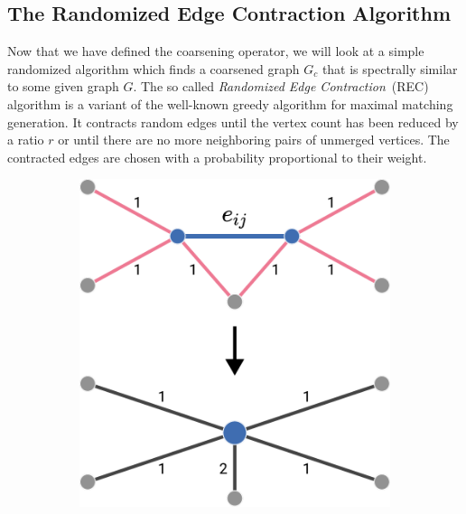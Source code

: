 \subsection{The Randomized Edge Contraction Algorithm}%
\label{sec:coarse:rec}

Now that we have defined the coarsening operator, we will look at a simple randomized algorithm which finds a coarsened graph $G_c$ that is spectrally similar to some given graph $G$.
The so called \textit{Randomized Edge Contraction}~(REC)~\cite{Loukas2018} algorithm is a variant of the well-known greedy algorithm for maximal matching generation.
It contracts random edges until the vertex count has been reduced by a ratio $r$ or until there are no more neighboring pairs of unmerged vertices.
The contracted edges are chosen with a probability proportional to their weight.
\begin{figure}[H]
	\setlength{\intextsep}{0pt}
	\begin{minipage}{0.6\linewidth}
		\begin{algorithm}[H]
			\caption{Randomized Edge Contraction}\label{algo:coarse:rec}
			\begin{algorithmic}[1]
					\EndWhile{}
				\EndFunction{}
			\end{algorithmic}
		\end{algorithm}
	\end{minipage}%
	\begin{minipage}{0.4\linewidth}
		\begin{figure}[H]
			\centering
			\includegraphics[width=0.75\linewidth]{gfx/coarse/rec.pdf}

\end{figure}
\end{minipage}
\end{figure}
